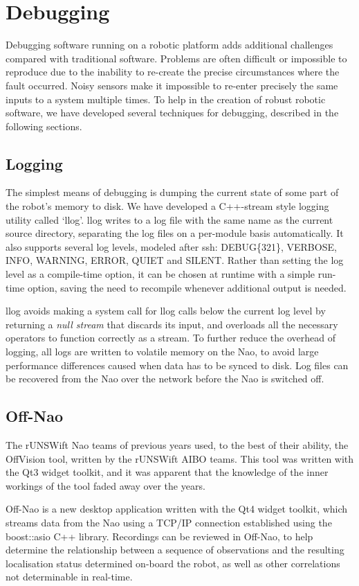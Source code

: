 \documentclass[pdftex,11pt,a4paper]{report}
\begin{document}
\section{Debugging}
Debugging software running on a robotic platform adds additional challenges compared with traditional software. Problems are often difficult or impossible to reproduce due to the inability to re-create the precise circumstances where the fault occurred. Noisy sensors make it impossible to re-enter precisely the same inputs to a system multiple times. To help in the creation of robust robotic software, we have developed several techniques for debugging, described in the following sections.
\subsection{Logging}
The simplest means of debugging is dumping the current state of some part of the
robot's memory to disk. We have developed a C++-stream style logging utility
called `llog'. llog writes to a log file with the same name as the current
source directory, separating the log files on a per-module basis automatically.
It also supports several log levels, modeled after ssh\cite{sshconfig}:
DEBUG\{321\}, VERBOSE, INFO, WARNING, ERROR, QUIET and SILENT. Rather than
setting the log level as a compile-time option, it can be chosen at runtime with
a simple run-time option, saving the need to recompile whenever additional
output is needed.

llog avoids making a system call for llog calls below the current log level by
returning a \emph{null stream} that discards its input, and overloads all the
necessary operators to function correctly as a stream. To further reduce the
overhead of logging, all logs are written to volatile memory on the Nao, to
avoid large performance differences caused when data has to be synced to disk.
Log files can be recovered from the Nao over the network before the Nao is
switched off.
\subsection{Off-Nao}
The rUNSWift Nao teams of previous years used, to the best of their ability,
the OffVision tool, written by the rUNSWift AIBO teams.  This tool was written
with the Qt3 widget toolkit, and it was apparent that the knowledge of the inner workings of the tool faded away over the years.

Off-Nao is a new desktop application written with the Qt4 widget toolkit, which
streams data from the Nao using a TCP/IP connection established using the
boost::asio C++ library. Recordings can be reviewed in Off-Nao, to help
determine the relationship between a sequence of observations and the resulting
localisation status determined on-board the robot, as well as other
correlations not determinable in real-time.
\end{document}
